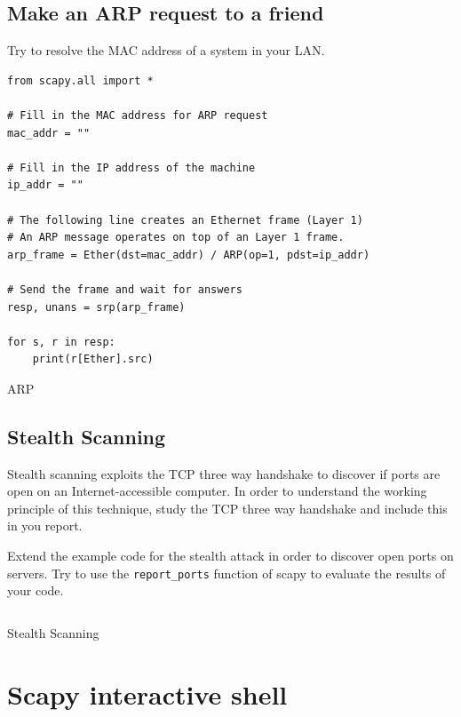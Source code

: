 \documentclass[11pt,a4paper]{article}
\begin{document}
\subsection{Make an ARP request to a friend}
Try to resolve the MAC address of a system in your LAN.

\begin{listing}[h]
\begin{verbatim}
from scapy.all import *

# Fill in the MAC address for ARP request
mac_addr = "" 

# Fill in the IP address of the machine
ip_addr = ""

# The following line creates an Ethernet frame (Layer 1)
# An ARP message operates on top of an Layer 1 frame.
arp_frame = Ether(dst=mac_addr) / ARP(op=1, pdst=ip_addr)

# Send the frame and wait for answers
resp, unans = srp(arp_frame)

for s, r in resp:
    print(r[Ether].src)
\end{verbatim}
\caption{ARP}\label{listing:stealth-scanning}
\end{listing}


\subsection{Stealth Scanning}
Stealth scanning exploits the TCP three way handshake to discover if ports are open on an Internet-accessible computer. In order to understand the working principle of this technique, study the TCP three way handshake and include this in you report.

Extend the example code for the stealth attack in order to discover open ports on servers.
Try to use the \texttt{report\_ports} function of scapy to evaluate the results of your code.


\begin{listing}[h]
\inputminted{python}{../code_students/stealth_scanning.py}
\caption{Stealth Scanning}%
\label{listing:stealth-scanning}
\end{listing}







\clearpage
\appendix
\section{Scapy interactive shell}\label{sec:scapy-interactive}
\end{document}

